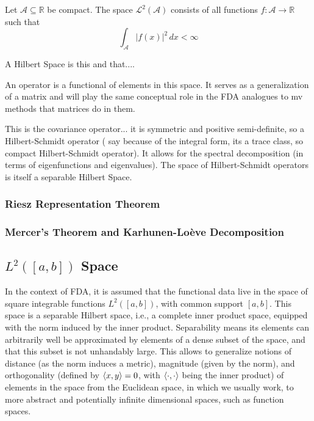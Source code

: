 \begin{definition}[$\mathcal{L}^2$]
    Let $\mathcal{A} \subseteq \mathbb{R}$ be compact. The space \( \mathcal{L}^2(\mathcal{A}) \)
    consists of all functions \( f: \mathcal{A} \to \mathbb{R} \) such that
    \[
    \int_{\mathcal{A}} |f(x)|^2 \, dx < \infty
    \]
\end{definition}

A Hilbert Space is this and that....

An operator is a functional of elements in this space. It serves as a generalization of
a matrix and will play the same conceptual role in the FDA analogues to mv methods
that matrices do in them.

This is the covariance operator... it is symmetric and positive semi-definite, so
a Hilbert-Schmidt operator (\textcite{WangChiouMüller2016} say because of the integral form,
its a trace class, so compact Hilbert-Schmidt operator). It allows for the spectral
decomposition (in terms of eigenfunctions and eigenvalues). The space of Hilbert-Schmidt
operators is itself a separable Hilbert Space.

\subsubsection{Riesz Representation Theorem}
\label{sec:riesz}

\subsubsection{Mercer's Theorem and Karhunen-Loève Decomposition}
\label{sec:mercer and kh}

\subsection{$L^2([a, b])$ Space}
\label{sec:l2 space}
In the context of FDA, it is assumed that the functional data live in
the space of square integrable functions $L^2([a,b])$, with common
support $[a,b]$. This space is a separable Hilbert space, i.e., a complete inner
product space, equipped with the norm induced by the inner product. Separability means
its elements can arbitrarily well be approximated by elements of a dense subset of the
space, and that this subset is not unhandably large.
This allows to generalize notions of distance (as the norm induces a
metric), magnitude (given by the norm), and orthogonality (defined by
$\left \langle x, y \right \rangle = 0$, with $\left \langle \cdot, \cdot \right \rangle$ being the inner product) of elements
in the space from the Euclidean space, in which we usually work, to more
abstract and potentially infinite dimensional spaces, such as function
spaces.

